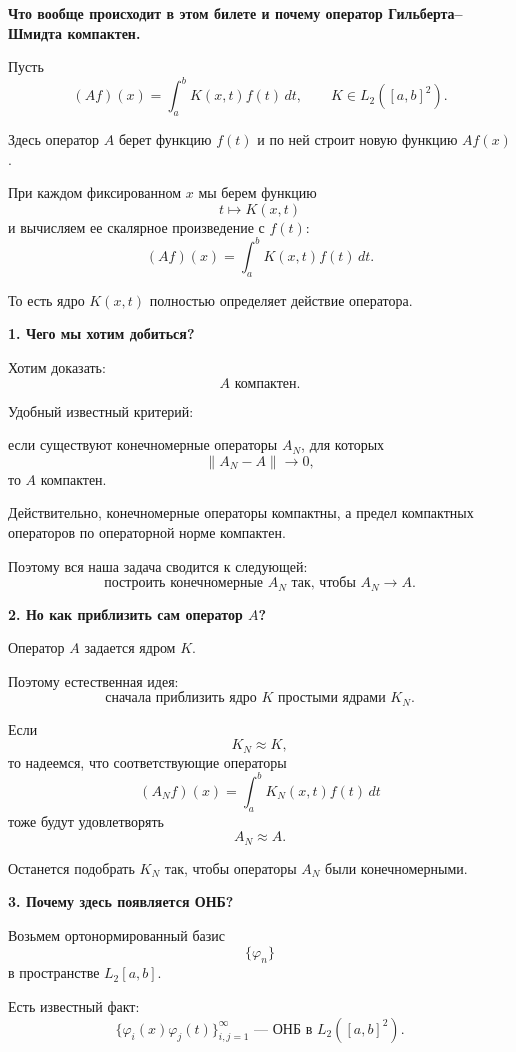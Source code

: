 \begin{idea}
	\textbf{Что вообще происходит в этом билете и почему оператор Гильберта--Шмидта компактен.}
	
	Пусть
	\[
	(Af)(x)
	=
	\int_a^b K(x,t)f(t)\,dt,
	\qquad
	K\in L_2([a,b]^2).
	\]
	
	Здесь оператор \(A\) берет функцию \(f(t)\) и по ней строит новую функцию
	\(Af(x)\).
	
	При каждом фиксированном \(x\) мы берем функцию
	\[
	t\mapsto K(x,t)
	\]
	и вычисляем ее скалярное произведение с \(f(t)\):
	\[
	(Af)(x)
	=
	\int_a^b K(x,t)f(t)\,dt.
	\]
	
	То есть ядро \(K(x,t)\) полностью определяет действие оператора.
	
	\medskip
	
	\textbf{1. Чего мы хотим добиться?}
	
	Хотим доказать:
	\[
	\boxed{A\text{ компактен}.}
	\]
	
	Удобный известный критерий:
	
	если существуют конечномерные операторы \(A_N\), для которых
	\[
	\|A_N-A\|\to0,
	\]
	то \(A\) компактен.
	
	Действительно, конечномерные операторы компактны, а предел компактных
	операторов по операторной норме компактен.
	
	Поэтому вся наша задача сводится к следующей:
	\[
	\boxed{
		\text{построить конечномерные }A_N
		\text{ так, чтобы }
		A_N\to A.
	}
	\]
	
	\medskip
	
	\textbf{2. Но как приблизить сам оператор \(A\)?}
	
	Оператор \(A\) задается ядром \(K\).
	
	Поэтому естественная идея:
	\[
	\boxed{
		\text{сначала приблизить ядро }K
		\text{ простыми ядрами }K_N.
	}
	\]
	
	Если
	\[
	K_N\approx K,
	\]
	то надеемся, что соответствующие операторы
	\[
	(A_Nf)(x)
	=
	\int_a^b K_N(x,t)f(t)\,dt
	\]
	тоже будут удовлетворять
	\[
	A_N\approx A.
	\]
	
	Останется подобрать \(K_N\) так, чтобы операторы \(A_N\)
	были конечномерными.
	
	\medskip
	
	\textbf{3. Почему здесь появляется ОНБ?}
	
	Возьмем ортонормированный базис
	\[
	\{\varphi_n\}
	\]
	в пространстве \(L_2[a,b]\).
	
	Есть известный факт:
	\[
	\boxed{
		\{\varphi_i(x)\varphi_j(t)\}_{i,j=1}^{\infty}
		\text{ --- ОНБ в }L_2([a,b]^2).
	}
	\]
	

\end{idea}
